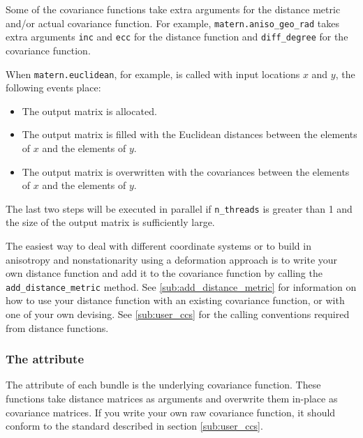 \documentclass[]{manual}
\begin{document}
Some of the covariance functions take extra arguments for the distance metric and/or actual covariance function. For example, \texttt{matern.aniso_geo_rad} takes extra arguments \texttt{inc} and \texttt{ecc} for the distance function and \texttt{diff_degree} for the covariance function.

When \texttt{matern.euclidean}, for example, is called with input locations $x$ and $y$, the following events place:
\begin{itemize}
	\item The output matrix is allocated.
	\item The output matrix is filled with the Euclidean distances between the elements of $x$ and the elements of $y$.
	\item The output matrix is overwritten with the covariances between the elements of $x$ and the elements of $y$.
\end{itemize}
The last two steps will be executed in parallel if \texttt{n_threads} is greater than 1 and the size of the output matrix is sufficiently large.

The easiest way to deal with different coordinate systems or to build in anisotropy and nonstationarity using a deformation approach \cite{sampson} is to write your own distance function and add it to the covariance function by calling the \texttt{add_distance_metric} method. See \ref{sub:add_distance_metric} for information on how to use your distance function with an existing covariance function, or with one of your own devising. See \ref{sub:user_ccs} for the calling conventions required from distance functions.  

\subsubsection{The  attribute}\label{sub:raw}
The  attribute of each bundle is the underlying covariance function. These functions take distance matrices as arguments and overwrite them in-place as covariance matrices. If you write your own raw covariance function, it should conform to the standard described in section \ref{sub:user_ccs}.
\end{document}
